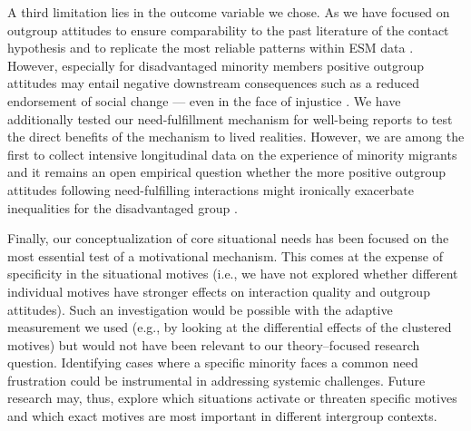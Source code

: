 \documentclass[man, 12pt, a4paper, mask]{apa7}
\theoremstyle{break}
\theoremstyle{plain}
\begin{document}
A third limitation lies in the outcome variable we chose. As we have focused on outgroup attitudes to ensure comparability to the past literature of the contact hypothesis and to replicate the most reliable patterns within ESM data \citep[][]{Pettigrew2006}. However, especially for disadvantaged minority members positive outgroup attitudes may entail negative downstream consequences such as a reduced endorsement of social change --- even in the face of injustice \citep[e.g.,][]{dixon2012}. We have additionally tested our need-fulfillment mechanism for well-being reports to test the direct benefits of the mechanism to lived realities. However, we are among the first to collect intensive longitudinal data on the experience of minority migrants and it remains an open empirical question whether the more positive outgroup attitudes following need-fulfilling interactions might ironically exacerbate inequalities for the disadvantaged group \citep[also see][]{reimer2023}. 

Finally, our conceptualization of core situational needs has been focused on the most essential test of a motivational mechanism. This comes at the expense of specificity in the situational motives (i.e., we have not explored whether different individual motives have stronger effects on interaction quality and outgroup attitudes). Such an investigation would be possible with the adaptive measurement we used (e.g., by looking at the differential effects of the clustered motives) but would not have been relevant to our theory–focused research question. Identifying cases where a specific minority faces a common need frustration could be instrumental in addressing systemic challenges. Future research may, thus, explore which situations activate or threaten specific motives \citep[e.g.,][]{gollwitzer1985e, leander2020} and which exact motives are most important in different intergroup contexts. 
\end{document}
